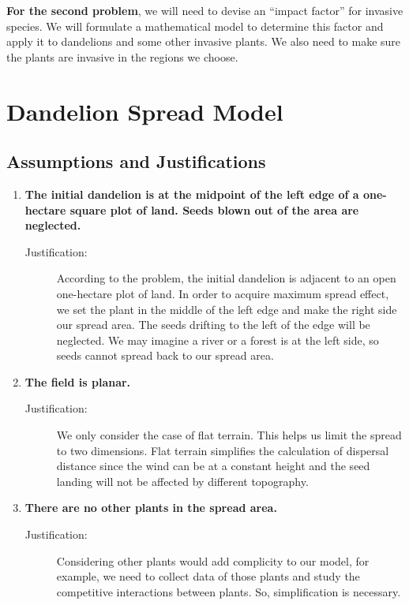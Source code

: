 \documentclass[12pt]{article}
\begin{document}
	\textbf{For the second problem}, we will need to devise an ``impact factor'' for invasive species.  We will formulate a mathematical model to determine this factor and apply it to dandelions and some other invasive plants.  We also need to make sure the plants are invasive in the regions we choose.

\section{Dandelion Spread Model}

	\subsection{Assumptions and Justifications}
	
		\begin{enumerate}
			
			\item \textbf{The initial dandelion is at the midpoint of the left edge of a one-hectare square plot of land.  Seeds blown out of the area are neglected.}
			\vspace{-0.125in}
			\begin{description}
				\item[Justification:] According to the problem, the initial dandelion is adjacent to an open one-hectare plot of land. In order to acquire maximum spread effect, we set the plant in the middle of the left edge and make the right side our spread area. The seeds drifting to the left of the edge will be neglected. We may imagine a river or a forest is at the left side, so seeds cannot spread back to our spread area.
			\end{description}
			
			\item \textbf{The field is planar.}
			\vspace{-0.125in}
			\begin{description}
				\item[Justification:] We only consider the case of flat terrain.  This helps us limit the spread to two dimensions.  Flat terrain simplifies the calculation of dispersal distance since the wind can be at a constant height and the seed landing will not be affected by different topography.
			\end{description}
			
			\item \textbf{There are no other plants in the spread area.}
			\vspace{-0.125in}
			\begin{description}
				\item[Justification:] Considering other plants would add complicity to our model, for example, we need to collect data of those plants and study the competitive interactions between plants.  So, simplification is necessary.
				

\end{description}
\end{enumerate}
\end{document}
